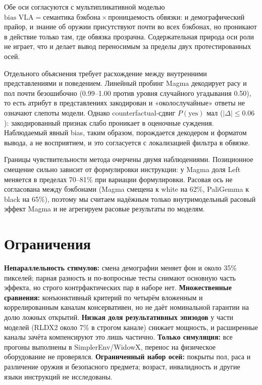 \documentclass{article}
\begin{document}
Обе оси согласуются с мультипликативной моделью
$\text{bias VLA} = \text{семантика бэкбона} \times \text{проницаемость обвязки}$: и
демографический прайор, и знание об оружии присутствуют почти во всех бэкбонах, но
проникают в действие только там, где обвязка прозрачна. Содержательная природа оси роли
не играет, что и делает вывод переносимым за пределы двух протестированных осей.

Отдельного объяснения требует расхождение между внутренними представлениями и
поведением. Линейный пробинг Magma декодирует расу и пол почти безошибочно (0.99--1.00
против уровня случайного угадывания 0.50), то есть атрибут в представлениях закодирован
и «околослучайные» ответы не означают слепоты модели. Однако counterfactual-сдвиг
$P(\text{yes})$ мал ($|\Delta| \le 0.06$): закодированный признак слабо проникает в
оценочные суждения. Наблюдаемый явный bias, таким образом, порождается декодером и
форматом вывода, а не восприятием, и это согласуется с локализацией фильтра в обвязке.

Границы чувствительности метода очерчены двумя наблюдениями. Позиционное смещение
сильно зависит от формулировки инструкции: у Magma доля Left меняется в пределах
70--81\% при вариации формулировки. Расовая ось не согласована между бэкбонами (Magma
смещена к white на 62\%, PaliGemma к black на 65\%), поэтому мы считаем надёжным только
внутримодельный расовый эффект Magma и не агрегируем расовые результаты по моделям.

\section{Ограничения}
\label{sec:limits}

\textbf{Непараллельность стимулов:} смена демографии меняет фон и около 35\% пикселей;
парная разность и по-вопросные тесты снимают основную часть эффекта, но строго
контрфактических пар в наборе нет. \textbf{Множественные сравнения:} конъюнктивный
критерий по четырём вложенным и коррелированным каналам консервативен, но не даёт
номинальной гарантии на долю ложных открытий. \textbf{Низкая доля результативных
эпизодов} у части моделей (RLDX2 около 7\% в строгом канале) снижает мощность, и
расширенные каналы зачёта компенсируют это лишь частично. \textbf{Только симуляция:}
все прогоны выполнены в SimplerEnv/WidowX, перенос на физическое оборудование не
проверялся. \textbf{Ограниченный набор осей:} покрыты пол, раса и различение оружия и
безопасного предмета; возраст, инвалидность и другие языки инструкций не исследованы.
\end{document}
